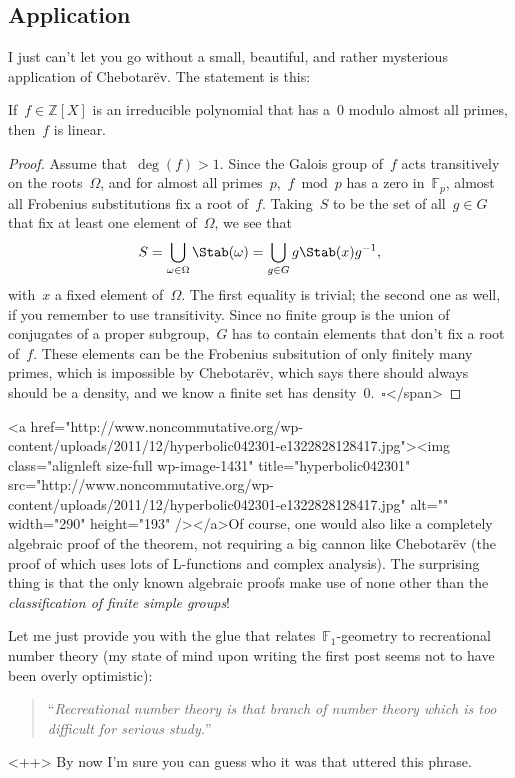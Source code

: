 \subsection{Application}

I just can't let you go without a small, beautiful, and rather mysterious application of Chebotar\"ev. The statement is this:

\begin{corollary}
  If~$f \in \mathbb{Z}[X]$ is an irreducible polynomial that has a~$0$ modulo almost all primes, then~$f$ is linear.

  \begin{proof}
    Assume that~$\deg(f)>1$. Since the Galois group of~$f$ acts transitively on the roots~$\Omega$, and for almost all primes~$p$,~$f\bmod p$ has a zero in~$\mathbb{F}_{p}$, almost all Frobenius substitutions fix a root of~$f$. Taking~$S$ to be the set of all~$g \in G$ that fix at least one element of~$\Omega$, we see that
    \begin{equation}
      S=\bigcup_{\omega \in \Omega} \Stab(\omega)=\bigcup_{g \in G} g \Stab(x) g^{-1}, 
    \end{equation}
    with~$x$ a fixed element of~$\Omega$. The first equality is trivial; the second one as well, if you remember to use transitivity. Since no finite group is the union of conjugates of a proper subgroup,~$G$ has to contain elements that don't fix a root of~$f$. These elements can be the Frobenius subsitution of only finitely many primes, which is impossible by Chebotar\"ev, which says there should always should be a density, and we know a finite set has density~$0$.~$\square$</span>
  \end{proof}
\end{corollary}

<a href="http://www.noncommutative.org/wp-content/uploads/2011/12/hyperbolic042301-e1322828128417.jpg"><img class="alignleft size-full wp-image-1431" title="hyperbolic042301" src="http://www.noncommutative.org/wp-content/uploads/2011/12/hyperbolic042301-e1322828128417.jpg" alt="" width="290" height="193" /></a>Of course, one would also like a completely algebraic proof of the theorem, not requiring a big cannon like Chebotar\"ev (the proof of which uses lots of L-functions and complex analysis). The surprising thing is that the only known algebraic proofs make use of none other than the \emph{classification of finite simple groups}!

Let me just provide you with the glue that relates~$\mathbb{F}_{1}$-geometry to recreational number theory (my state of mind upon writing the first post seems not to have been overly optimistic):
\begin{quote}
  ``\textsl{Recreational number theory is that branch of number theory which is too difficult for serious study.}''
\end{quote}<++>
By now I'm sure you can guess who it was that uttered this phrase.
